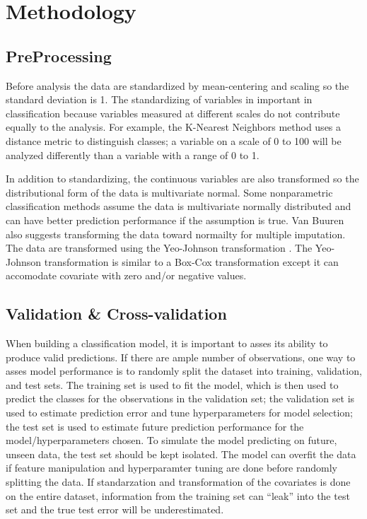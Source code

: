 \documentclass[12pt,]{article}
\begin{document}
\newpage

\section{Methodology}\label{methodology}

\subsection{PreProcessing}\label{preprocessing}

Before analysis the data are standardized by mean-centering and scaling
so the standard deviation is 1. The standardizing of variables in
important in classification because variables measured at different
scales do not contribute equally to the analysis. For example, the
K-Nearest Neighbors method uses a distance metric to distinguish
classes; a variable on a scale of 0 to 100 will be analyzed differently
than a variable with a range of 0 to 1.

In addition to standardizing, the continuous variables are also
transformed so the distributional form of the data is multivariate
normal. Some nonparametric classification methods assume the data is
multivariate normally distributed and can have better prediction
performance if the assumption is true. Van Buuren
\autocite*[pp.106-107]{van_buuren_flexible_2012} also suggests
transforming the data toward normailty for multiple imputation. The data
are transformed using the Yeo-Johnson transformation
\autocite{yeo_new_2000}. The Yeo-Johnson transformation is similar to a
Box-Cox transformation except it can accomodate covariate with zero
and/or negative values.

\subsection{Validation \&
Cross-validation}\label{validation-cross-validation}

When building a classification model, it is important to asses its
ability to produce valid predictions. If there are ample number of
observations, one way to asses model performance is to randomly split
the dataset into training, validation, and test sets. The training set
is used to fit the model, which is then used to predict the classes for
the observations in the validation set; the validation set is used to
estimate prediction error and tune hyperparameters for model selection;
the test set is used to estimate future prediction performance for the
model/hyperparameters chosen. To simulate the model predicting on
future, unseen data, the test set should be kept isolated. The model can
overfit the data if feature manipulation and hyperparamter tuning are
done before randomly splitting the data. If standarzation and
transformation of the covariates is done on the entire dataset,
information from the training set can ``leak'' into the test set and the
true test error will be underestimated.
\end{document}
